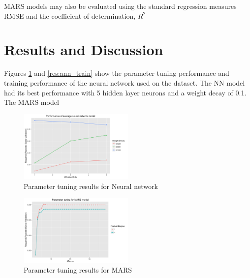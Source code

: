 \documentclass[conference]{IEEEtran}
\begin{document}
MARS models may also be evaluated using the standard regression measures RMSE and the coefficient of determination, $R^2$

\section{Results and Discussion}
Figures \ref{res:ann_tune} and \ref{res:ann_train} show the parameter tuning performance and training performance of the neural network used on the dataset. The NN model had its best performance with 5 hidden layer neurons and a weight decay of 0.1. The MARS model 

\begin{figure}[!h]
    \centering
    \includegraphics[width=0.5\textwidth]{avgnnet_rsqr.png}
    \caption{Parameter tuning results for Neural network}
    \label{res:ann_tune}
\end{figure}
\begin{figure}[!h]
    \centering
    \includegraphics[width=0.5\textwidth]{mars_rsqr.png}
    \caption{Parameter tuning results for MARS}
    \label{res:mars_tune}
\end{figure}
\end{document}
